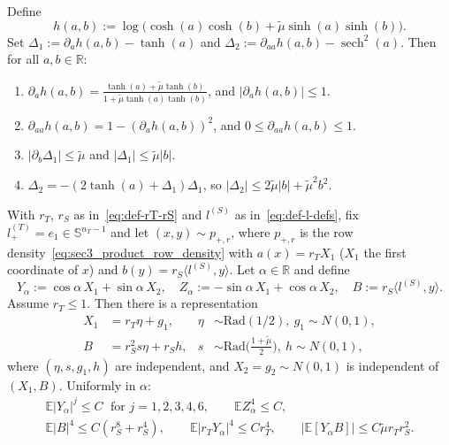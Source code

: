 \documentclass[10pt,a4paper]{amsart}
\newcommand{\Ebb}{\mathbb E}
\newcommand{\R}{\mathbb R}
\newcommand{\ip}[2]{\langle #1,#2\rangle}
\newcommand{\nT}{n_{\trg}}
\newcommand{\sphere}[1]{\mathbb S^{#1}}
\newcommand{\src}{S}
\newcommand{\trg}{T}
\begin{document}
\begin{lemma}
\label{lem:sec3_product_odd_pert}
Define
\[
    h(a,b):=\log\!\bigl(\cosh(a)\cosh(b)+\tilde\mu\sinh(a)\sinh(b)\bigr).
\]
Set $\Delta_1:=\partial_a h(a,b)-\tanh(a)$ and
$\Delta_2:=\partial_{aa}h(a,b)-\operatorname{sech}^2(a)$.  Then for all
$a,b\in\R$:
\begin{enumerate}[label=(\roman*)]
\item $\displaystyle\partial_a h(a,b)
      =
      \frac{\tanh(a)+\tilde\mu\tanh(b)}{1+\tilde\mu\tanh(a)\tanh(b)}$,
      and $|\partial_a h(a,b)|\le 1$.
\item $\partial_{aa}h(a,b)=1-(\partial_a h(a,b))^2$,
      and $0\le\partial_{aa}h(a,b)\le 1$.
\item $|\partial_b\Delta_1|\le\tilde\mu$ and $|\Delta_1|\le\tilde\mu|b|$.
\item $\Delta_2=-(2\tanh(a)+\Delta_1)\Delta_1$,
      so $|\Delta_2|\le 2\tilde\mu|b|+\tilde\mu^2 b^2$.
\end{enumerate}
\end{lemma}

\begin{lemma}
\label{lem:sec3_product_moment_bds}
With $r_T$, $r_S$ as in~\eqref{eq:def-rT-rS} and $l^{(\src)}$ as in~\eqref{eq:def-l-defs}, fix
$l^{(\trg)}_+=e_1\in\sphere{\nT-1}$ and let $(x,y)\sim p_{+,r}$, where
$p_{+,r}$ is the row density~\eqref{eq:sec3_product_row_density} with
$a(x)=r_T X_1$ ($X_1$ the first coordinate of $x$) and
$b(y)=r_S\ip{l^{(\src)}}{y}$.
Let $\alpha\in\R$ and define
\[
    Y_\alpha:=\cos\alpha\,X_1+\sin\alpha\,X_2, \quad
    Z_\alpha:=-\sin\alpha\,X_1+\cos\alpha\,X_2, \quad
    B:=r_S\ip{l^{(\src)}}{y}.
\]
Assume $r_T\le1$.  Then there is a representation
\begin{align}
    X_1 &= r_T\eta+g_1, & \eta&\sim\mathrm{Rad}(1/2),\ g_1\sim N(0,1),
    \label{eq:sec3_product_X1_decomp}\\
    B   &= r_S^2 s\eta+r_S h, & s&\sim\mathrm{Rad}\!\bigl(\tfrac{1+\tilde\mu}{2}\bigr),\
    h\sim N(0,1), \label{eq:sec3_product_B_decomp}
\end{align}
where $(\eta,s,g_1,h)$ are independent, and $X_2=g_2\sim N(0,1)$ is
independent of $(X_1,B)$.  Uniformly in $\alpha$:
\begin{gather*}
    \Ebb|Y_\alpha|^j\le C\;\text{ for }j=1,2,3,4,6, \qquad
    \Ebb Z_\alpha^4\le C,\\
    \Ebb|B|^4\le C(r_S^8+r_S^4), \qquad
    \Ebb|r_T Y_\alpha|^4\le Cr_T^4, \qquad
    |\Ebb[Y_\alpha B]|\le C\tilde\mu r_T r_S^2.
\end{gather*}
\end{lemma}
\end{document}
